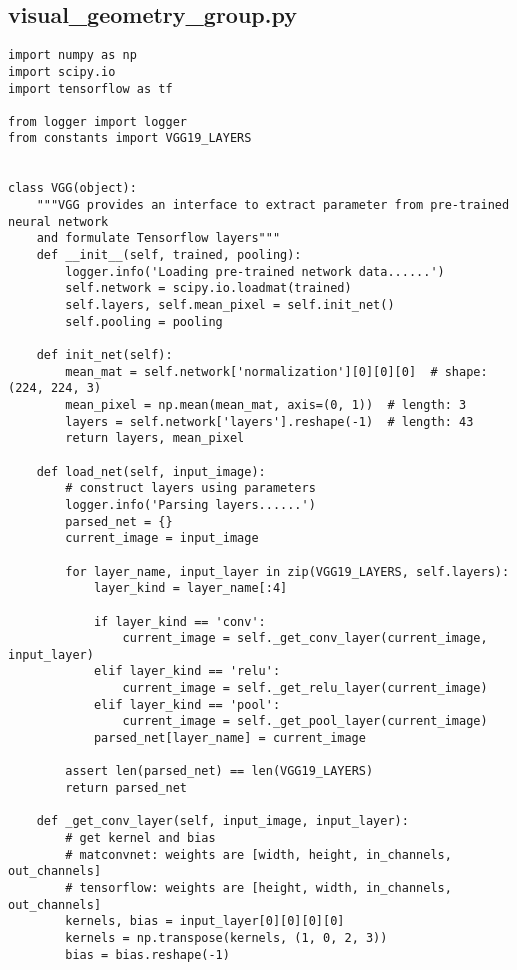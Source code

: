 
\newpage
\begin{spacing}{1}
\section{visual\_geometry\_group.py}
\label{sec:code:vgg}
\begin{lstlisting}
import numpy as np
import scipy.io
import tensorflow as tf

from logger import logger
from constants import VGG19_LAYERS


class VGG(object):
    """VGG provides an interface to extract parameter from pre-trained neural network
    and formulate Tensorflow layers"""
    def __init__(self, trained, pooling):
        logger.info('Loading pre-trained network data......')
        self.network = scipy.io.loadmat(trained)
        self.layers, self.mean_pixel = self.init_net()
        self.pooling = pooling

    def init_net(self):
        mean_mat = self.network['normalization'][0][0][0]  # shape: (224, 224, 3)
        mean_pixel = np.mean(mean_mat, axis=(0, 1))  # length: 3
        layers = self.network['layers'].reshape(-1)  # length: 43
        return layers, mean_pixel

    def load_net(self, input_image):
        # construct layers using parameters
        logger.info('Parsing layers......')
        parsed_net = {}
        current_image = input_image

        for layer_name, input_layer in zip(VGG19_LAYERS, self.layers):
            layer_kind = layer_name[:4]

            if layer_kind == 'conv':
                current_image = self._get_conv_layer(current_image, input_layer)
            elif layer_kind == 'relu':
                current_image = self._get_relu_layer(current_image)
            elif layer_kind == 'pool':
                current_image = self._get_pool_layer(current_image)
            parsed_net[layer_name] = current_image

        assert len(parsed_net) == len(VGG19_LAYERS)
        return parsed_net

    def _get_conv_layer(self, input_image, input_layer):
        # get kernel and bias
        # matconvnet: weights are [width, height, in_channels, out_channels]
        # tensorflow: weights are [height, width, in_channels, out_channels]
        kernels, bias = input_layer[0][0][0][0]
        kernels = np.transpose(kernels, (1, 0, 2, 3))
        bias = bias.reshape(-1)


\end{lstlisting}
\end{spacing}

